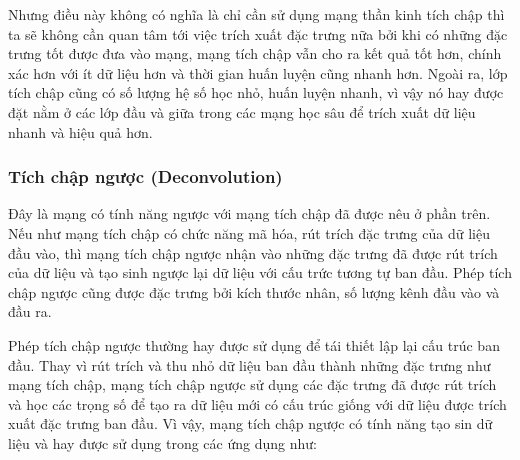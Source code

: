 Nhưng điều này không có nghĩa là chỉ cần sử dụng mạng thần kinh tích chập thì ta sẽ không cần quan tâm tới việc trích xuất đặc trưng nữa bởi khi có những đặc trưng tốt được đưa vào mạng, mạng tích chập vẫn cho ra kết quả tốt hơn, chính xác hơn với ít dữ liệu hơn và thời gian huấn luyện cũng nhanh hơn. Ngoài ra, lớp tích chập cũng có số lượng hệ số học nhỏ, huấn luyện nhanh, vì vậy nó hay được đặt nằm ở các lớp đầu và giữa trong các mạng học sâu để trích xuất dữ liệu nhanh và hiệu quả hơn.

\subsubsection{Tích chập ngược (Deconvolution)}

Đây là mạng có tính năng ngược với mạng tích chập đã được nêu ở phần trên. Nếu như mạng tích chập có chức năng mã hóa, rút trích đặc trưng của dữ liệu đầu vào, thì mạng tích chập ngược nhận vào những đặc trưng đã được rút trích của dữ liệu và tạo sinh ngược lại dữ liệu với cấu trức tương tự ban đầu. Phép tích chập ngược cũng được đặc trưng bởi kích thước nhân, số lượng kênh đầu vào và đầu ra.

Phép tích chập ngược thường hay được sử dụng để tái thiết lập lại cấu trúc ban đầu. Thay vì rút trích và thu nhỏ dữ liệu ban đầu thành những đặc trưng như mạng tích chập, mạng tích chập ngược sử dụng các đặc trưng đã được rút trích và học các trọng số để tạo ra dữ liệu mới có cấu trúc giống với dữ liệu được trích xuất đặc trưng ban đầu. Vì vậy, mạng tích chập ngược có tính năng tạo sin dữ liệu và hay được sử dụng trong các ứng dụng như:

